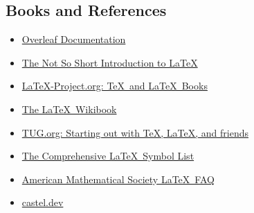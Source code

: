\subsection{Books and References}
\label{sec:books_and_references}
\begin{itemize}
    \item \href{https://www.overleaf.com/learn}{Overleaf Documentation}
    \item \href{https://tobi.oetiker.ch/lshort/lshort.pdf}{The Not So Short Introduction to \LaTeX}
    \item \href{https://www.latex-project.org/help/books/}{LaTeX-Project.org: \TeX\ and \LaTeX\ Books}
    \item \href{https://en.wikibooks.org/wiki/LaTeX}{The \LaTeX\ Wikibook}
    \item \href{https://tug.org/begin.html}{TUG.org: Starting out with \TeX, \LaTeX, and friends}
    \item \href{https://ctan.org/pkg/comprehensive}{The Comprehensive \LaTeX\ Symbol List}
    \item \href{https://www.ams.org/publications/authors/faq/author-faq}{American Mathematical Society \LaTeX\ FAQ}
    \item \href{https://castel.dev/}{castel.dev}
\end{itemize}

